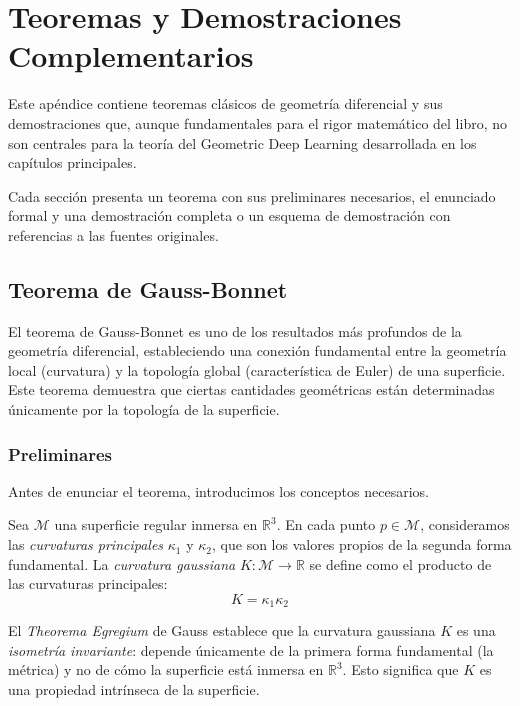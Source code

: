 \chapter{Teoremas y Demostraciones Complementarios}\label{ch:teoremas_complementarios}

Este apéndice contiene teoremas clásicos de geometría diferencial y sus demostraciones que, aunque fundamentales para el rigor matemático del libro, no son centrales para la teoría del Geometric Deep Learning desarrollada en los capítulos principales.

Cada sección presenta un teorema con sus preliminares necesarios, el enunciado formal y una demostración completa o un esquema de demostración con referencias a las fuentes originales.

\section{Teorema de Gauss-Bonnet}\label{sec:gauss_bonnet}

El teorema de Gauss-Bonnet es uno de los resultados más profundos de la geometría  diferencial, estableciendo una conexión fundamental entre la geometría local (curvatura) y la topología global (característica de Euler) de una superficie.  Este teorema demuestra que ciertas cantidades geométricas están determinadas  únicamente por la topología de la superficie.

\subsection{Preliminares}\label{subsec:gauss_bonnet_preliminares}

Antes de enunciar el teorema, introducimos los conceptos necesarios.

\begin{definition}\label{def:curvatura_gaussiana_apendice}
Sea $\mathcal{M}$ una superficie regular inmersa en $\mathbb{R}^3$. En cada punto $p \in \mathcal{M}$, consideramos las \textit{curvaturas principales} $\kappa_1$ y $\kappa_2$, que son los valores propios de la segunda forma fundamental. La \textit{curvatura gaussiana} $K: \mathcal{M} \to \mathbb{R}$ se define como el producto de las curvaturas principales:
\begin{equation}\label{eq:curvatura_gaussiana}
K = \kappa_1 \kappa_2
\end{equation}
\end{definition}

\begin{remark}
El \textit{Theorema Egregium} de Gauss establece que la curvatura gaussiana $K$ es una \textit{isometría invariante}: depende únicamente de la primera forma fundamental (la métrica) y no de cómo la superficie está inmersa en $\mathbb{R}^3$. Esto significa que $K$ es una propiedad intrínseca de la superficie.
\end{remark}

